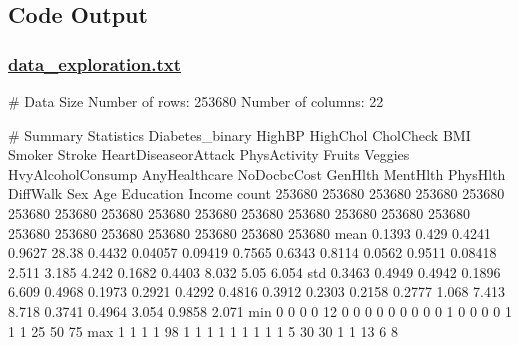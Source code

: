 \documentclass[11pt]{article}
\begin{document}
\subsection{Code Output}\hypertarget{file-data-exploration-txt}{}

\subsubsection*{\hyperlink{code-Data Exploration-data-exploration-txt}{data\_exploration.txt}}

\begin{codeoutput}
# Data Size
Number of rows: 253680
Number of columns: 22

# Summary Statistics
       Diabetes_binary  HighBP  HighChol  CholCheck    BMI  Smoker  Stroke  HeartDiseaseorAttack  PhysActivity  Fruits  Veggies  HvyAlcoholConsump  AnyHealthcare  NoDocbcCost  GenHlth  MentHlth  PhysHlth  DiffWalk    Sex    Age  Education  Income
count           253680  253680    253680     253680 253680  253680  253680                253680        253680  253680   253680             253680         253680       253680   253680    253680    253680    253680 253680 253680     253680  253680
mean            0.1393   0.429    0.4241     0.9627  28.38  0.4432 0.04057               0.09419        0.7565  0.6343   0.8114             0.0562         0.9511      0.08418    2.511     3.185     4.242    0.1682 0.4403  8.032       5.05   6.054
std             0.3463  0.4949    0.4942     0.1896  6.609  0.4968  0.1973                0.2921        0.4292  0.4816   0.3912             0.2303         0.2158       0.2777    1.068     7.413     8.718    0.3741 0.4964  3.054     0.9858   2.071
min                  0       0         0          0     12       0       0                     0             0       0        0                  0              0            0        1         0         0         0      0      1          1       1
25%
50%
75%
max                  1       1         1          1     98       1       1                     1             1       1        1                  1              1            1        5        30        30         1      1     13          6       8


\end{codeoutput}
\end{document}
